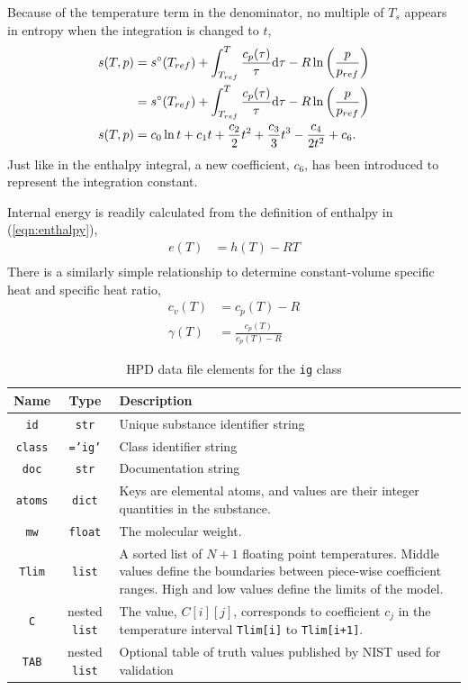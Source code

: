 Because of the temperature term in the denominator, no multiple of $T_s$ appears in entropy when the integration is changed to $t$,
\begin{align}
s(T,p) &= s^\circ(T_{ref}) + \int_{T_{ref}}^T \frac{c_p(\tau)}{\tau}\mathrm{d} \tau - R \ln \left( \frac{p}{p_{ref}} \right)\nonumber\\
 &= s^\circ(T_{ref}) + \int_{T_{ref}}^T \frac{c_p(\tau)}{\tau}\mathrm{d} \tau - R \ln \left( \frac{p}{p_{ref}} \right)\nonumber\\
s(T,p) &= c_0 \ln t + c_1 t + \frac{c_2}{2} t^2 + \frac{c_3}{3} t^3 -\frac{c_4}{2t^2} + c_6.
\end{align}
Just like in the enthalpy integral, a new coefficient, $c_6$, has been introduced to represent the integration constant.

Internal energy is readily calculated from the definition of enthalpy in (\ref{eqn:enthalpy}),
\begin{align}
e(T) &= h(T) - RT\nonumber\\
\end{align}
There is a similarly simple relationship to determine constant-volume specific heat and specific heat ratio,
\begin{align}
c_v(T) &= c_p(T) - R\\
\gamma(T) &= \frac{c_p(T)}{c_p(T)-R}
\end{align}

\begin{table}
\centering
\caption{HPD data file elements for the \texttt{ig} class}\label{tab:class:ig}
\begin{tabular}{|ccp{2.5in}|}
\hline
Name & Type & Description\\
\hline
\texttt{id} & \texttt{str} & Unique substance identifier string\\
\texttt{class} & \texttt{='ig'} & Class identifier string\\
\texttt{doc} & \texttt{str} & Documentation string\\
\hline
\texttt{atoms} & \texttt{dict} & Keys are elemental atoms, and values are their integer quantities in the substance.\\
\texttt{mw} & \texttt{float} & The molecular weight.\\
\texttt{Tlim} & \texttt{list} & A sorted list of $N+1$ floating point temperatures.  Middle values define the boundaries between piece-wise coefficient ranges.  High and low values define the limits of the model.\\
\texttt{C} & nested \texttt{list} & The value, $C[i][j]$, corresponds to coefficient $c_j$ in the temperature interval \texttt{Tlim[i]} to \texttt{Tlim[i+1]}.\\
\hline
\texttt{TAB} & nested \texttt{list} & Optional table of truth values published by NIST used for validation\\
\hline
\end{tabular}
\end{table}


